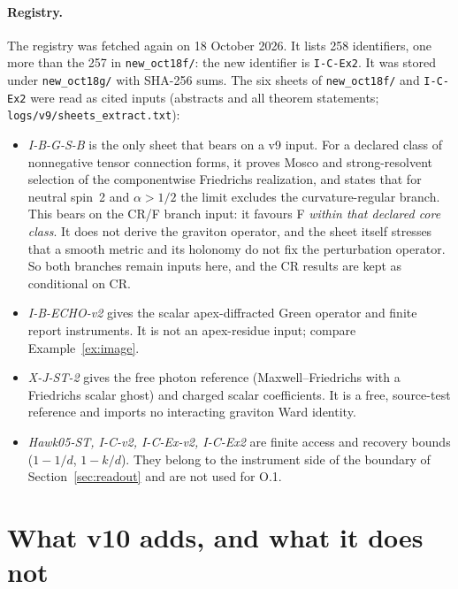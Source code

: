 \documentclass[11pt,a4paper]{article}
\newcommand{\loc}[1]{\nolinkurl{#1}}
\theoremstyle{plain}
\theoremstyle{definition}
\theoremstyle{remark}
\numberwithin{equation}{section}
\begin{document}
\paragraph{Registry.} The registry was fetched again on 18 October
2026. It lists 258 identifiers, one more than the 257 in
\loc{new_oct18f/}: the new identifier is \loc{I-C-Ex2}. It was
stored under \loc{new_oct18g/} with SHA-256 sums. The six sheets
of \loc{new_oct18f/} and \loc{I-C-Ex2} were read as cited inputs
(abstracts and all theorem statements; \loc{logs/v9/sheets_extract.txt}):
\begin{itemize}
\item \emph{I-B-G-S-B} \cite{CheungIBGSBv9} is the only sheet that
bears on a v9 input. For a declared class of nonnegative tensor
connection forms, it proves Mosco and strong-resolvent selection of
the componentwise Friedrichs realization, and states that for
neutral spin~2 and \(\alpha>1/2\) the limit excludes the
curvature-regular branch. This bears on the CR/F branch input: it
favours F \emph{within that declared core class}. It does not
derive the graviton operator, and the sheet itself stresses that a
smooth metric and its holonomy do not fix the perturbation
operator. So both branches remain inputs here, and the CR results
are kept as conditional on CR.
\item \emph{I-B-ECHO-v2} \cite{CheungEchoV2} gives the scalar
apex-diffracted Green operator and finite report instruments. It
is not an apex-residue input; compare Example~\ref{ex:image}.
\item \emph{X-J-ST-2} \cite{CheungXJST2} gives the free photon
reference (Maxwell--Friedrichs with a Friedrichs scalar ghost) and
charged scalar coefficients. It is a free, source-test reference
and imports no interacting graviton Ward identity.
\item \emph{Hawk05-ST, I-C-v2, I-C-Ex-v2, I-C-Ex2}
\cite{CheungHawk05ST,CheungICv2,CheungICExv2,CheungICEx2} are
finite access and recovery bounds (\(1-1/d\), \(1-k/d\)). They
belong to the instrument side of the boundary of
Section~\ref{sec:readout} and are not used for O.1.
\end{itemize}

\section{What v10 adds, and what it does not}
\label{sec:whatv10}
\end{document}

